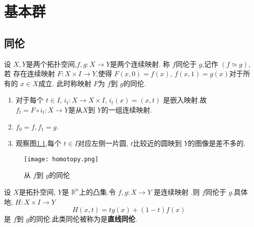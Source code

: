 \documentclass[../../几何与拓扑.tex]{subfiles}
\begin{document}
    

\chapter{基本群}

\section{同伦}

\begin{definition}
    设 \(  X,Y  \)是两个拓扑空间,\(  f,g  : X\to Y\)是两个连续映射.
    称 \(  f  \)同伦于 \(  g  \),记作 \(  \left( f\simeq g \right)   \),若
    存在连续映射 \(  F:X\times I\to Y  \),使得 \(  F\left(x,0 \right)= f\left( x \right)    \), \(  f\left( x,1 \right)= g\left( x \right)    \)对于所有的
     \(  x \in X  \)成立.   此时称映射 \(  F  \)为 \(  f  \)到 \(  g  \)的同伦.         
\end{definition}

\begin{remark}
    
    \begin{enumerate}
        \item 对于每个 \(  t \in I  \), \(  i _{t}: X \to X \times I\), \(  i _{t}\left( x \right) =  \left( x,t\right)    \)   是嵌入映射.故 \(  f_{t} =  F\circ i_{t}:X\to Y \)是从\(  X  \)到 \(  Y  \)的一组连续映射.
        \item \(  f_{0}= f,f_{1}= g  \).    
        \item 观察图\ref{graph:homotopy},每个 \(  t \in I  \)对应左侧一片圆, \(  t  \)比较近的圆映到 \(  Y  \)的图像是差不多的.   
    \end{enumerate}
    
\end{remark}
\begin{figure}[h]
    \centering
    \texttt{[image: homotopy.png]}
    \caption{从  \(  f  \)到 \(  g  \)的同伦  }
    \label{graph:homotopy}
\end{figure}



\begin{example}
    设 \(  X  \)是拓扑空间, \(  Y  \)是 \(  \mathbb{R} ^{n}  \)上的凸集.令 \(  f,g:X\to Y  \)    是连续映射
    .则 \(  f  \)同伦于 \(  g  \).具体地, \(  H: X\times I\to Y  \) \[
    H\left( x,t \right) =  tg\left( x \right)+ \left( 1-t \right)f\left( x \right)    
    \]是 \(  f  \)到 \(  g  \)的同伦.此类同伦被称为是\textbf{直线同伦}.
\end{example}
\hspace*{\fill} 
\end{document}
